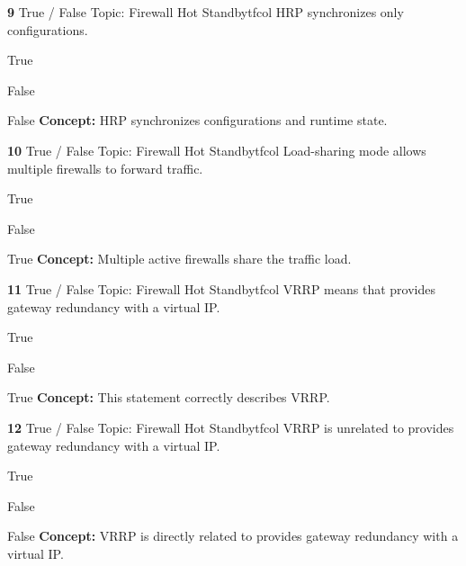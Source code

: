 \documentclass[10pt,a4paper]{article}
\begin{document}
\begin{qcard}{\color{white}\textbf{9} \hfill \small True / False \textbar{} Topic: Firewall Hot Standby}{tfcol}
HRP synchronizes only configurations.

\begin{qoptions}
\item True
\item False
\end{qoptions}
\begin{explainbox}{False}
\textbf{Concept:} HRP synchronizes configurations and runtime state.
\end{explainbox}
\end{qcard}

\begin{qcard}{\color{white}\textbf{10} \hfill \small True / False \textbar{} Topic: Firewall Hot Standby}{tfcol}
Load-sharing mode allows multiple firewalls to forward traffic.

\begin{qoptions}
\item True
\item False
\end{qoptions}
\begin{explainbox}{True}
\textbf{Concept:} Multiple active firewalls share the traffic load.
\end{explainbox}
\end{qcard}

\begin{qcard}{\color{white}\textbf{11} \hfill \small True / False \textbar{} Topic: Firewall Hot Standby}{tfcol}
VRRP means that provides gateway redundancy with a virtual IP.

\begin{qoptions}
\item True
\item False
\end{qoptions}
\begin{explainbox}{True}
\textbf{Concept:} This statement correctly describes VRRP.
\end{explainbox}
\end{qcard}

\begin{qcard}{\color{white}\textbf{12} \hfill \small True / False \textbar{} Topic: Firewall Hot Standby}{tfcol}
VRRP is unrelated to provides gateway redundancy with a virtual IP.

\begin{qoptions}
\item True
\item False
\end{qoptions}
\begin{explainbox}{False}
\textbf{Concept:} VRRP is directly related to provides gateway redundancy with a virtual IP.
\end{explainbox}
\end{qcard}
\end{document}
